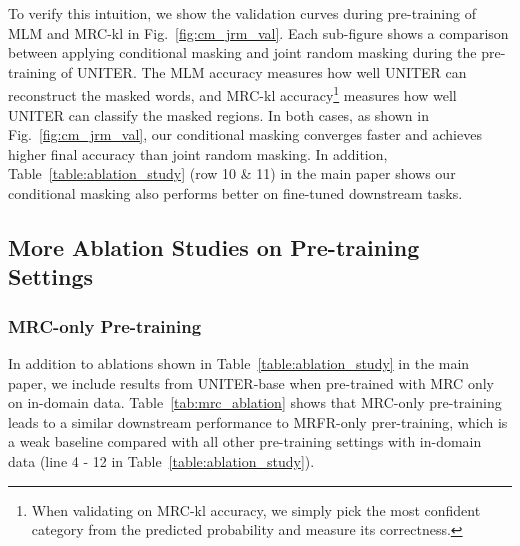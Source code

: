 \documentclass[runningheads]{llncs}
\begin{document}
To verify this intuition, we show the validation curves during pre-training of MLM and MRC-kl in Fig.~\ref{fig:cm_jrm_val}.
Each sub-figure shows a comparison between applying conditional masking and joint random masking during the pre-training of UNITER.
The MLM accuracy measures how well UNITER can reconstruct the masked words, and MRC-kl accuracy\footnote{When validating on MRC-kl accuracy, we simply pick the most confident category from the predicted probability and measure its correctness.} measures how well UNITER can classify the masked regions.
In both cases, as shown in Fig.~\ref{fig:cm_jrm_val}, our conditional masking converges faster and achieves higher final accuracy than joint random masking.
In addition, Table~\ref{table:ablation_study} (row 10 \& 11) in the main paper shows our conditional masking also performs better on fine-tuned downstream tasks.

\subsection{More Ablation Studies on Pre-training Settings}
\subsubsection{MRC-only Pre-training}
In addition to ablations shown in Table~\ref{table:ablation_study} in the main paper, we include results from UNITER-base when pre-trained with MRC only on in-domain data. Table~\ref{tab:mrc_ablation} shows that MRC-only pre-training leads to a similar downstream performance to MRFR-only prer-training, which is a weak baseline compared with all other pre-training settings with in-domain data (line 4 - 12 in Table~\ref{table:ablation_study}).
\end{document}
